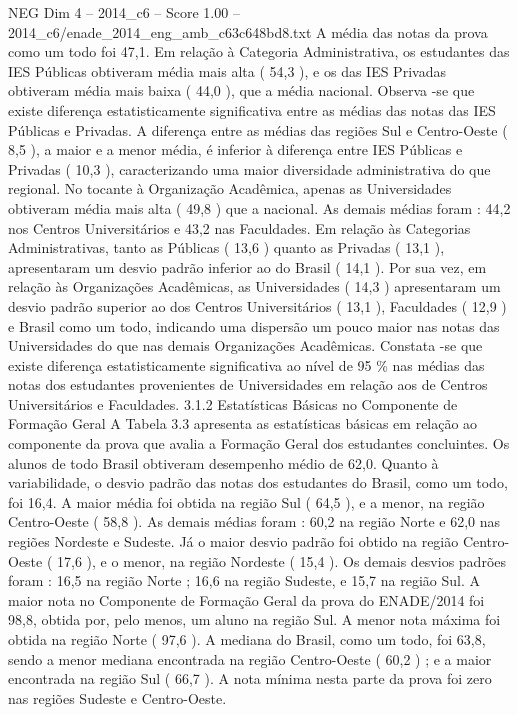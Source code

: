 \begin{textsample}{NEG Dim 4 – 2014\_c6 – Score 1.00 – 2014\_c6/enade\_2014\_eng\_amb\_c63c648bd8.txt}
A média das notas da prova como um todo foi 47,1.
Em relação à Categoria Administrativa, os estudantes das IES Públicas obtiveram média mais alta ( 54,3 ), e os das IES Privadas obtiveram média mais baixa ( 44,0 ), que a média nacional.
Observa -se que existe diferença estatisticamente significativa entre as médias das notas das IES Públicas e Privadas.
A diferença entre as médias das regiões Sul e Centro-Oeste ( 8,5 ), a maior e a menor média, é inferior à diferença entre IES Públicas e Privadas ( 10,3 ), caracterizando uma maior diversidade administrativa do que regional.
No tocante à Organização Acadêmica, apenas as Universidades obtiveram média mais alta ( 49,8 ) que a nacional.
As demais médias foram : 44,2 nos Centros Universitários e 43,2 nas Faculdades.
Em relação às Categorias Administrativas, tanto as Públicas ( 13,6 ) quanto as Privadas ( 13,1 ), apresentaram um desvio padrão inferior ao do Brasil ( 14,1 ).
Por sua vez, em relação às Organizações Acadêmicas, as Universidades ( 14,3 ) apresentaram um desvio padrão superior ao dos Centros Universitários ( 13,1 ), Faculdades ( 12,9 ) e Brasil como um todo, indicando uma dispersão um pouco maior nas notas das Universidades do que nas demais Organizações Acadêmicas.
Constata -se que existe diferença estatisticamente significativa ao nível de 95 \% nas médias das notas dos estudantes provenientes de Universidades em relação aos de Centros Universitários e Faculdades. 3.1.2 Estatísticas Básicas no Componente de Formação Geral A Tabela 3.3 apresenta as estatísticas básicas em relação ao componente da prova que avalia a Formação Geral dos estudantes concluintes.
Os alunos de todo Brasil obtiveram desempenho médio de 62,0.
Quanto à variabilidade, o desvio padrão das notas dos estudantes do Brasil, como um todo, foi 16,4.
A maior média foi obtida na região Sul ( 64,5 ), e a menor, na região Centro-Oeste ( 58,8 ).
As demais médias foram : 60,2 na região Norte e 62,0 nas regiões Nordeste e Sudeste.
Já o maior desvio padrão foi obtido na região Centro-Oeste ( 17,6 ), e o menor, na região Nordeste ( 15,4 ).
Os demais desvios padrões foram : 16,5 na região Norte ; 16,6 na região Sudeste, e 15,7 na região Sul.
A maior nota no Componente de Formação Geral da prova do ENADE/2014 foi 98,8, obtida por, pelo menos, um aluno na região Sul.
A menor nota máxima foi obtida na região Norte ( 97,6 ).
A mediana do Brasil, como um todo, foi 63,8, sendo a menor mediana encontrada na região Centro-Oeste ( 60,2 ) ; e a maior encontrada na região Sul ( 66,7 ).
A nota mínima nesta parte da prova foi zero nas regiões Sudeste e Centro-Oeste.

\end{textsample}
